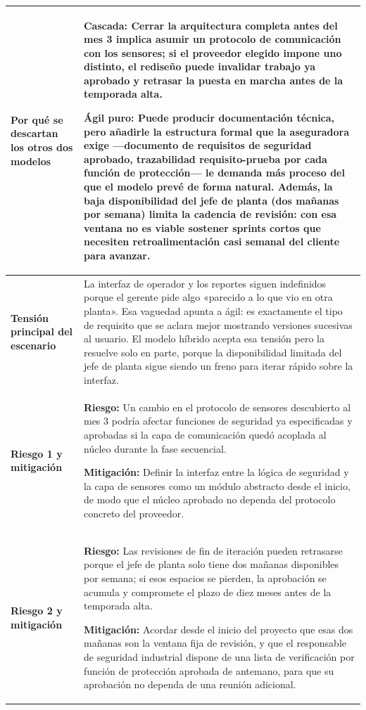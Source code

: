 \documentclass[12pt,a4paper]{article}
\begin{document}
\begin{longtable}{>{\raggedright\arraybackslash}p{3.3cm} >{\raggedright\arraybackslash}p{12.2cm}}
\textbf{Por qué se descartan los otros dos modelos} & \textbf{Cascada:} Cerrar la arquitectura completa antes del mes 3 implica asumir un protocolo de comunicación con los sensores; si el proveedor elegido impone uno distinto, el rediseño puede invalidar trabajo ya aprobado y retrasar la puesta en marcha antes de la temporada alta.\par\medskip \textbf{Ágil puro:} Puede producir documentación técnica, pero añadirle la estructura formal que la aseguradora exige ---documento de requisitos de seguridad aprobado, trazabilidad requisito-prueba por cada función de protección--- le demanda más proceso del que el modelo prevé de forma natural. Además, la baja disponibilidad del jefe de planta (dos mañanas por semana) limita la cadencia de revisión: con esa ventana no es viable sostener sprints cortos que necesiten retroalimentación casi semanal del cliente para avanzar. \\ \midrule
\textbf{Tensión principal del escenario} & La interfaz de operador y los reportes siguen indefinidos porque el gerente pide algo «parecido a lo que vio en otra planta». Esa vaguedad apunta a ágil: es exactamente el tipo de requisito que se aclara mejor mostrando versiones sucesivas al usuario. El modelo híbrido acepta esa tensión pero la resuelve solo en parte, porque la disponibilidad limitada del jefe de planta sigue siendo un freno para iterar rápido sobre la interfaz. \\ \midrule
\textbf{Riesgo 1 y mitigación} & \textbf{Riesgo:} Un cambio en el protocolo de sensores descubierto al mes 3 podría afectar funciones de seguridad ya especificadas y aprobadas si la capa de comunicación quedó acoplada al núcleo durante la fase secuencial.\par\medskip \textbf{Mitigación:} Definir la interfaz entre la lógica de seguridad y la capa de sensores como un módulo abstracto desde el inicio, de modo que el núcleo aprobado no dependa del protocolo concreto del proveedor. \\ \midrule
\textbf{Riesgo 2 y mitigación} & \textbf{Riesgo:} Las revisiones de fin de iteración pueden retrasarse porque el jefe de planta solo tiene dos mañanas disponibles por semana; si esos espacios se pierden, la aprobación se acumula y compromete el plazo de diez meses antes de la temporada alta.\par\medskip \textbf{Mitigación:} Acordar desde el inicio del proyecto que esas dos mañanas son la ventana fija de revisión, y que el responsable de seguridad industrial dispone de una lista de verificación por función de protección aprobada de antemano, para que su aprobación no dependa de una reunión adicional. \\ \midrule
\bottomrule
\end{longtable}
\endgroup
\end{document}

